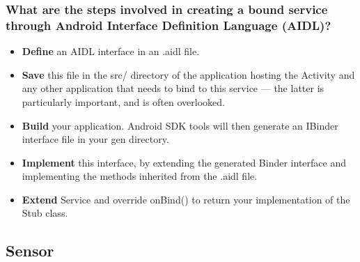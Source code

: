 \documentclass[9pt, b5paper]{article}
\begin{document}
\subsubsection{What are the steps involved in creating a bound service through Android Interface Definition Language (AIDL)?}
\label{sec-1-4-7}
\begin{itemize}
\item \textbf{Define} an AIDL interface in an .aidl file.
\item \textbf{Save} this file in the src/ directory of the application hosting the Activity and any other application that needs to bind to this service — the latter is particularly important, and is often overlooked.
\item \textbf{Build} your application. Android SDK tools will then generate an IBinder interface file in your gen directory.
\item \textbf{Implement} this interface, by extending the generated Binder interface and implementing the methods inherited from the .aidl file.
\item \textbf{Extend} Service and override onBind() to return your implementation of the Stub class.
\end{itemize}
\subsection{Sensor}
\label{sec-1-5}
\end{document}

